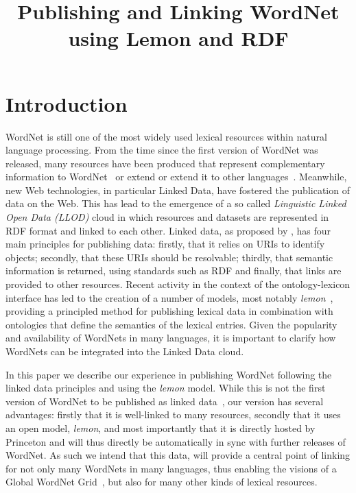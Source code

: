 \documentclass[10pt, a4paper]{article}
\title{Publishing and Linking WordNet using Lemon and RDF}
\newcommand{\lemon}[0]{\emph{lemon}}
\begin{document}
\maketitleabstract

\section{Introduction}

WordNet is still one of the most widely used lexical resources within natural 
language processing. From the time since the first version of WordNet was released, many
resources have been produced that represent complementary information to WordNet~\cite{schuler2005verbnet,baker1998berkeley} or extend
or extend it to other languages~\cite{vossen1998eurowordnet,bond2013linking}. 
Meanwhile, new Web technologies, in particular Linked Data, have fostered the publication of data on the Web.
This has lead to the emergence of a so called \emph{Linguistic Linked Open Data (LLOD)} cloud in which resources and datasets are represented in RDF format and linked to each other.
Linked data, as proposed by \cite{berners2011linked}, has four
main principles for publishing data: firstly, that it relies on URIs to identify
objects; secondly, that these URIs should be resolvable; thirdly, that semantic
information is returned, using standards such as RDF and finally, that links are
provided to other resources. 
Recent activity in the context of the ontology-lexicon interface has
led to the creation of a number of models, most notably
\lemon{}~\cite{mccrae2012interchanging}, providing a principled method for publishing lexical data in combination with ontologies that define the semantics of the lexical entries.
Given the popularity and availability of WordNets in
many languages, it is important to clarify how WordNets can be integrated into the Linked Data cloud.

In this paper we describe our experience
in publishing WordNet following the linked data principles and using the \lemon{} model. While this is not
the first version of WordNet to be published as linked data~\cite{van2006conversion,mccrae2012integrating,graves2006data}, our 
version has several advantages: firstly that it is well-linked to many
resources, secondly that it uses an open model, \emph{lemon}, and most importantly that 
it is directly hosted by Princeton and will thus directly be automatically in sync with further releases of WordNet. 
As such we intend that this data, will provide a central point of linking for
not only many WordNets in many languages, thus enabling the visions of a Global
WordNet Grid~\cite{pease2008building}, but also for many other kinds of lexical resources. 
\end{document}
